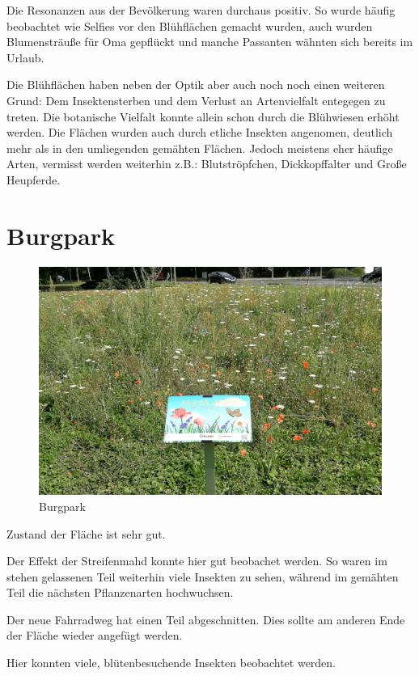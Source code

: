 \documentclass[10pt]{article}
\begin{document}
Die Resonanzen aus der Bevölkerung waren durchaus positiv. So wurde häufig beobachtet wie Selfies vor den Blühflächen gemacht wurden, auch wurden Blumensträuße für Oma gepflückt und manche Passanten wähnten sich bereits im Urlaub.

Die Blühflächen haben neben der Optik aber auch noch noch einen weiteren Grund: Dem Insektensterben und dem Verlust an Artenvielfalt entegegen zu treten. Die botanische Vielfalt konnte allein schon durch die Blühwiesen erhöht werden. Die Flächen wurden auch durch etliche Insekten angenomen, deutlich mehr als in den umliegenden gemähten Flächen. Jedoch meistens eher häufige Arten, vermisst werden weiterhin z.B.: Blutströpfchen, Dickkopffalter und Große Heupferde.


\newpage

\section{Burgpark}

\begin{figure}[h!]
  \includegraphics[width=\linewidth]{img/infotafeln.jpg}
  \caption{Burgpark}
  \label{fig:boat1}
\end{figure}

\begin{flushleft}
Zustand der Fläche ist sehr gut.

Der Effekt der Streifenmahd konnte hier gut beobachet werden.
So waren im stehen gelassenen Teil weiterhin viele Insekten zu sehen, während im gemähten Teil die nächsten Pflanzenarten hochwuchsen.

Der neue Fahrradweg hat einen Teil abgeschnitten. 
Dies sollte am anderen Ende der Fläche wieder angefügt werden.

Hier konnten viele, blütenbesuchende Insekten beobachtet werden.

\end{flushleft}
\end{document}
